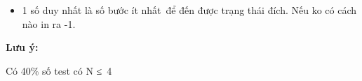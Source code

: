 \begin{itemize}
	\item     1 số duy nhất là số bước ít nhất để đến được trạng thái đích. Nếu ko có cách nào in ra -1.   
\end{itemize}

\textbf{     Lưu ý:    }

    Có 40\% số test có N ≤ 4   

\